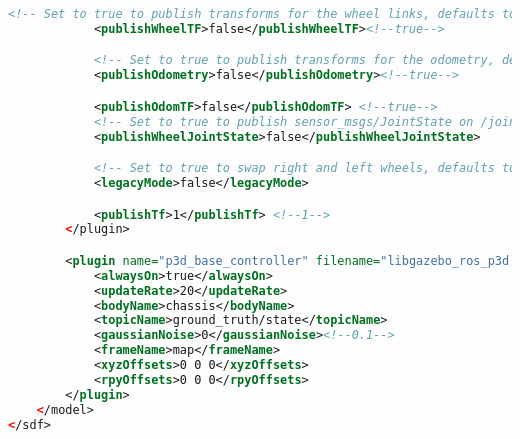 \begin{appendices}
\begin{lstlisting}[language=XML]
			<!-- Set to true to publish transforms for the wheel links, defaults to false -->
			<publishWheelTF>false</publishWheelTF><!--true-->

			<!-- Set to true to publish transforms for the odometry, defaults to true -->
			<publishOdometry>false</publishOdometry><!--true-->

			<publishOdomTF>false</publishOdomTF> <!--true-->
			<!-- Set to true to publish sensor_msgs/JointState on /joint_states for the wheel joints, defaults to false -->
			<publishWheelJointState>false</publishWheelJointState>

			<!-- Set to true to swap right and left wheels, defaults to true -->
			<legacyMode>false</legacyMode>

			<publishTf>1</publishTf> <!--1-->
		</plugin>

		<plugin name="p3d_base_controller" filename="libgazebo_ros_p3d.so">
			<alwaysOn>true</alwaysOn>
			<updateRate>20</updateRate>
			<bodyName>chassis</bodyName>
			<topicName>ground_truth/state</topicName>
			<gaussianNoise>0</gaussianNoise><!--0.1-->
			<frameName>map</frameName>
			<xyzOffsets>0 0 0</xyzOffsets>
			<rpyOffsets>0 0 0</rpyOffsets>
		</plugin>
	</model>
</sdf>
\end{lstlisting}
\end{appendices}